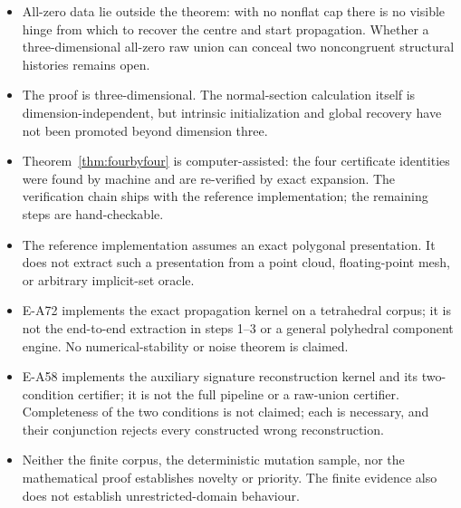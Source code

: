 \documentclass[11pt]{amsart}
\theoremstyle{definition}
\begin{document}
\begin{itemize}
\item All-zero data lie outside the theorem: with no nonflat cap there is no
visible hinge from which to recover the centre and start propagation.  Whether
a three-dimensional all-zero raw union can conceal two noncongruent structural
histories remains open.
\item The proof is three-dimensional.  The normal-section calculation itself
is dimension-independent, but intrinsic initialization and global recovery
have not been promoted beyond dimension three.
\item Theorem~\ref{thm:fourbyfour} is computer-assisted: the four certificate
identities were found by machine and are re-verified by exact expansion.  The
verification chain ships with the reference implementation; the remaining
steps are hand-checkable.
\item The reference implementation assumes an exact polygonal presentation.
It does not extract such a presentation from a point cloud, floating-point
mesh, or arbitrary implicit-set oracle.
\item E-A72 implements the exact propagation kernel on a tetrahedral corpus;
it is not the end-to-end extraction in steps 1--3 or a general polyhedral
component engine.  No numerical-stability or noise theorem is claimed.
\item E-A58 implements the auxiliary signature reconstruction kernel and its
two-condition certifier; it is not the full pipeline or a raw-union certifier.
Completeness of the two conditions is not claimed; each is necessary, and
their conjunction rejects every constructed wrong reconstruction.
\item Neither the finite corpus, the deterministic mutation sample, nor the
mathematical proof establishes novelty or priority.  The finite evidence also
does not establish unrestricted-domain behaviour.
\end{itemize}

\enlargethispage{6\baselineskip}
\begingroup
\small


\endgroup
\end{document}

